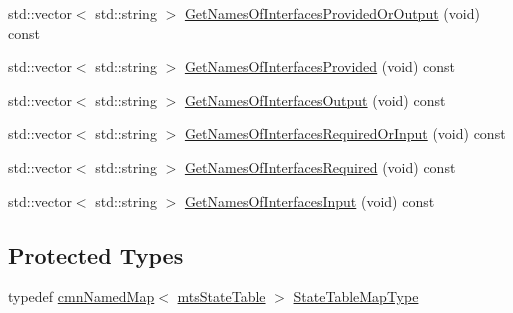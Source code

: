 {\bf }\par
\begin{DoxyCompactItemize}
\item 
std\+::vector$<$ std\+::string $>$ \hyperlink{classmts_component_a47c01c52746292887b04935f9aa226a4}{Get\+Names\+Of\+Interfaces\+Provided\+Or\+Output} (void) const 
\item 
std\+::vector$<$ std\+::string $>$ \hyperlink{classmts_component_ae07a68e9fe183f59313b883cc5881b72}{Get\+Names\+Of\+Interfaces\+Provided} (void) const 
\item 
std\+::vector$<$ std\+::string $>$ \hyperlink{classmts_component_a248bd90750c55caac917551864d8bdaa}{Get\+Names\+Of\+Interfaces\+Output} (void) const 
\end{DoxyCompactItemize}

{\bf }\par
\begin{DoxyCompactItemize}
\item 
std\+::vector$<$ std\+::string $>$ \hyperlink{classmts_component_a9de9c44e70304a61f96b263f6f7e8404}{Get\+Names\+Of\+Interfaces\+Required\+Or\+Input} (void) const 
\item 
std\+::vector$<$ std\+::string $>$ \hyperlink{classmts_component_afa31d381a8dbc92764ea4012f3615bdb}{Get\+Names\+Of\+Interfaces\+Required} (void) const 
\item 
std\+::vector$<$ std\+::string $>$ \hyperlink{classmts_component_a0c8cf423dae11b5646cedfacd1aeff33}{Get\+Names\+Of\+Interfaces\+Input} (void) const 
\end{DoxyCompactItemize}

\subsection*{Protected Types}
\begin{DoxyCompactItemize}
\item 
typedef \hyperlink{classcmn_named_map}{cmn\+Named\+Map}$<$ \hyperlink{classmts_state_table}{mts\+State\+Table} $>$ \hyperlink{classmts_component_afd25509fe46d10ebc7a53347aa21c4ec}{State\+Table\+Map\+Type}
\end{DoxyCompactItemize}
